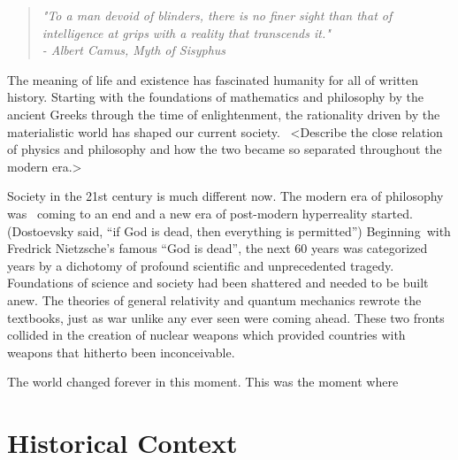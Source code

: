 \label{Chapter-2}

\begin{quote}
\centering \emph{"To a man devoid of blinders, there is no finer sight than that of intelligence at grips with a reality that transcends it."}\\
\centering \emph{- Albert Camus, Myth of Sisyphus}
\end{quote}

\hfill

The meaning of life and existence has fascinated humanity for all of
written history. Starting with the foundations of mathematics and
philosophy by the ancient Greeks through the time of enlightenment, the
rationality driven by the materialistic world has shaped our current
society.~ \textless Describe the close relation of physics and
philosophy and how the two became so separated throughout the modern
era.\textgreater{}

Society in the 21st century is much different now. The modern era of
philosophy was~ coming to an end and a new era of post-modern
hyperreality started. (Dostoevsky said, ``if God is dead, then
everything is permitted'') Beginning~with Fredrick Nietzsche's famous
``God is dead'', the next 60 years was categorized years by a dichotomy
of profound scientific and unprecedented tragedy. Foundations of science
and society had been shattered and needed to be built anew. The theories
of general relativity and quantum mechanics rewrote the textbooks, just
as war unlike any ever seen were coming ahead. These two fronts collided
in the creation of nuclear weapons which provided countries with weapons
that hitherto been inconceivable.

The world changed forever in this moment. This was the moment where

\hypertarget{Section-2.1}{%
\section{Historical Context}\label{Section-2.1}}


